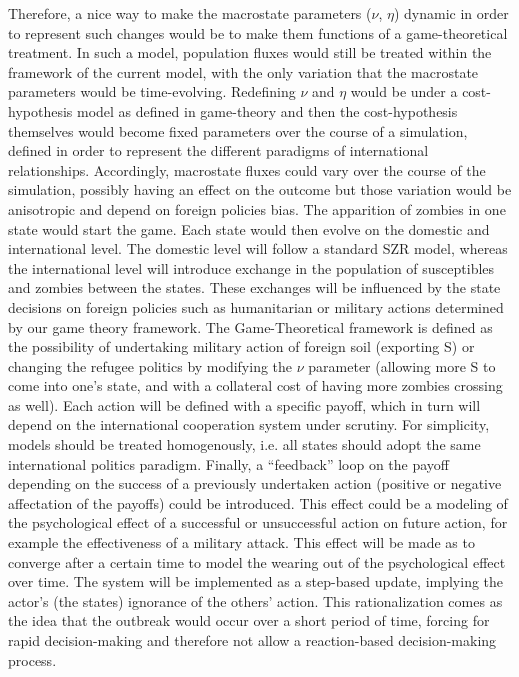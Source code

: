 \documentclass[11pt]{article} %
\begin{document}
Therefore, a nice way to make the macrostate parameters ($\nu$, $\eta$) dynamic in order to represent such changes would be to make them functions of a game-theoretical treatment. In such a model, population fluxes would still be treated within the framework of the current model, with the only variation that the macrostate parameters would be time-evolving. Redefining $\nu$ and $\eta$ would be under a cost-hypothesis model as defined in game-theory and then the cost-hypothesis themselves would become fixed parameters over the course of a simulation, defined in order to represent the different paradigms of international relationships. Accordingly, macrostate fluxes could vary over the course of the simulation, possibly having an effect on the outcome but those variation would be anisotropic and depend on foreign policies bias. The apparition of zombies in one state would start the game. Each state would then evolve on the domestic and international level. The domestic level will follow a standard SZR model, whereas the international level will introduce exchange in the population of susceptibles and zombies between the states. These exchanges will be influenced by the state decisions on foreign policies such as humanitarian or military actions determined by our game theory framework. The Game-Theoretical framework is defined as the possibility of undertaking military action of foreign soil (exporting S) or changing the refugee politics by modifying the $\nu$ parameter (allowing more S to come into one's state, and with a collateral cost of having more zombies crossing as well). Each action will be defined with a specific payoff, which in turn will depend on the international cooperation system under scrutiny. For simplicity, models should be treated homogenously, i.e. all states should adopt the same international politics paradigm. Finally, a ``feedback'' loop on the payoff depending on the success of a previously undertaken action (positive or negative affectation of the payoffs) could be introduced. This effect could be a modeling of the psychological effect of a successful or unsuccessful action on future action, for example the effectiveness of a military attack. This effect will be made as to converge after a certain time to model the wearing out of the psychological effect over time. The system will be implemented as a step-based update, implying the actor's (the states) ignorance of the others' action. This rationalization comes as the idea that the outbreak would occur over a short period of time, forcing for rapid decision-making and therefore not allow a reaction-based decision-making process. 
\end{document}
